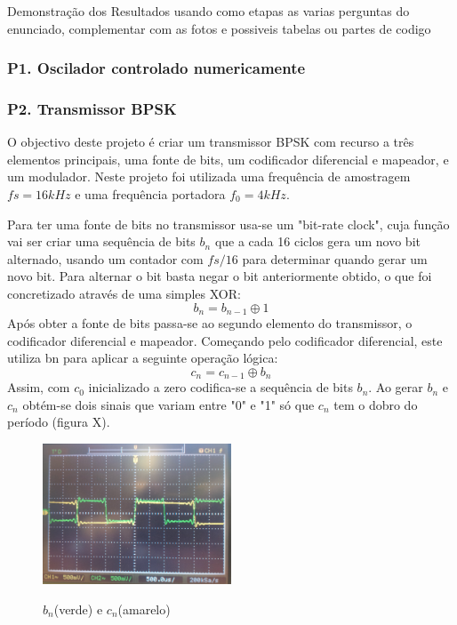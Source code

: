 \documentclass[11pt]{article}
\begin{document}
 Demonstração dos Resultados usando como etapas as varias perguntas do enunciado, complementar com as fotos e possiveis tabelas ou partes de codigo

\subsubsection{P1. Oscilador controlado numericamente}


\subsubsection{P2. Transmissor BPSK}

O objectivo deste projeto é criar um transmissor BPSK com recurso a três elementos principais, uma fonte de bits, um codificador diferencial e mapeador, e um modulador.
Neste projeto foi utilizada uma frequência de amostragem $fs=16kHz$ e uma frequência portadora $f_0=4kHz$.

Para ter uma fonte de bits no transmissor usa-se um "bit-rate clock", cuja função vai ser criar uma sequência de bits $ b_n $ que a cada 16 ciclos gera um novo bit alternado, usando um contador com $fs/16$ para determinar quando gerar um novo bit. Para alternar o bit basta negar o bit anteriormente obtido, o que foi concretizado através de uma simples XOR:
\begin{equation}
b_n=b_{n-1} \oplus 1
\end{equation}
Após obter a fonte de bits passa-se ao segundo elemento do transmissor, o codificador diferencial e mapeador. Começando pelo codificador diferencial, este utiliza bn para aplicar a seguinte operação lógica:
\begin{equation}
c_n=c_{n-1} \oplus b_n
\end{equation}
Assim, com $c_0$ inicializado a zero codifica-se a sequência de bits $ b_n $. Ao gerar $ b_n $ e $ c_n $ obtém-se dois sinais que variam entre "0" e "1" só que $ c_n $ tem o dobro do período (figura X).
\begin{figure}[h]
	\centering
	\includegraphics[width=0.5\textwidth]{./bn_cn}~\\
	\caption{$ b_n $(verde) e $ c_n $(amarelo)}
\end{figure}
\end{document}
